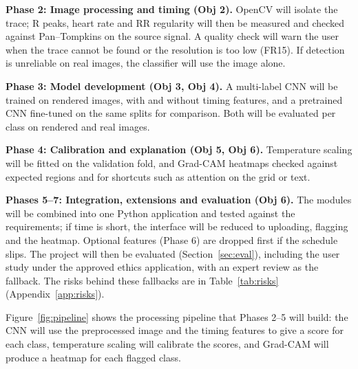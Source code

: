 \textbf{Phase 2: Image processing and timing (Obj 2).} OpenCV will isolate the trace; R peaks, heart rate and RR regularity will then be measured and checked against Pan--Tompkins on the source signal. A quality check will warn the user when the trace cannot be found or the resolution is too low (FR15). If detection is unreliable on real images, the classifier will use the image alone.

\textbf{Phase 3: Model development (Obj 3, Obj 4).} A multi-label CNN will be trained on rendered images, with and without timing features, and a pretrained CNN fine-tuned on the same splits for comparison. Both will be evaluated per class on rendered and real images.

\textbf{Phase 4: Calibration and explanation (Obj 5, Obj 6).} Temperature scaling will be fitted on the validation fold, and Grad-CAM heatmaps checked against expected regions and for shortcuts such as attention on the grid or text.

\textbf{Phases 5--7: Integration, extensions and evaluation (Obj 6).} The modules will be combined into one Python application and tested against the requirements; if time is short, the interface will be reduced to uploading, flagging and the heatmap. Optional features (Phase 6) are dropped first if the schedule slips. The project will then be evaluated (Section~\ref{sec:eval}), including the user study under the approved ethics application, with an expert review as the fallback. The risks behind these fallbacks are in Table~\ref{tab:risks} (Appendix~\ref{app:risks}).

Figure~\ref{fig:pipeline} shows the processing pipeline that Phases 2--5 will build: the CNN will use the preprocessed image and the timing features to give a score for each class, temperature scaling will calibrate the scores, and Grad-CAM will produce a heatmap for each flagged class.

